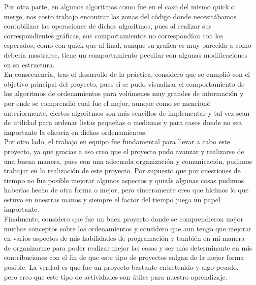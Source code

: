 \documentclass[a4paper,12pt]{article}
\begin{document}
Por otra parte, en algunos algoritmos como fue en el caso del mismo quick o merge, nos costo trabajo encontrar las zonas del código donde necesitábamos contabilizar las operaciones de dichos algoritmos, pues al realizar sus correspondientes gráficas, sus comportamientos no correspondían con los esperados, como con quick que al final, aunque su grafica es muy parecida a como debería mostrarse, tiene un comportamiento peculiar con algunas modificaciones en su estructura.\\

En consecuencia, tras el desarrollo de la práctica, considero que se cumplió con el objetivo principal del proyecto, pues si se pudo visualizar el comportamiento de los algoritmos de ordenamientos para volúmenes muy grandes de información y por ende se comprendió cual fue el mejor, aunque como se mencionó anteriormente, ciertos algoritmos son más sencillos de implementar y tal vez sean de utilidad para ordenar listas pequeñas o medianas y para casos donde no sea importante la eficacia en dichos ordenamientos.\\

Por otro lado, el trabajo en equipo fue fundamental para llevar a cabo este proyecto, ya que gracias a eso creo que el proyecto pudo avanzar y realizarse de una buena manera, pues con una adecuada organización y comunicación, pudimos trabajar en la realización de este proyecto. Por supuesto que por cuestiones de tiempo no fue posible mejorar algunos aspectos y quizás algunas cosas pudimos haberlas hecho de otra forma o mejor, pero sinceramente creo que hicimos lo que estuvo en nuestras manos y siempre el factor del tiempo juega un papel importante.\\

Finalmente, considero que fue un buen proyecto donde se comprendieron mejor muchos conceptos sobre los ordenamientos y considero que aun tengo que mejorar en varios aspectos de mis habilidades de programación y también en mi manera de organizarme para poder realizar mejor las cosas y ser más determinante en mis contribuciones con el fin de que este tipo de proyectos salgan de la mejor forma posible. La verdad es que fue un proyecto bastante entretenido y algo pesado, pero creo que este tipo de actividades son útiles para nuestro aprendizaje.



\end{document}
